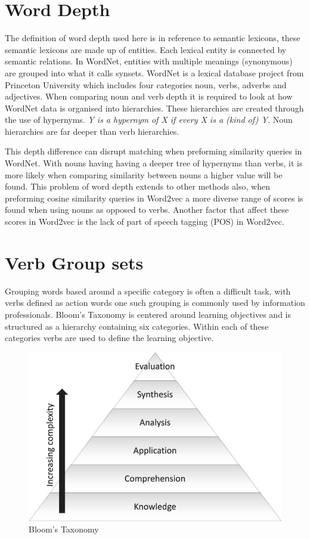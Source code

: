 \section{Word Depth} 
The definition of word depth used here is in reference to semantic lexicons, these semantic lexicons are made up of entities. Each lexical entity is connected by semantic relations. In WordNet, entities with multiple meanings (synonymous) are grouped into what it calls synsets. WordNet is a lexical database project from Princeton University which includes four categories noun, verbs, adverbs and adjectives. When comparing noun and verb depth it is required to look at how WordNet data is organised into hierarchies. These hierarchies are created through the use of hypernyms. \textit{Y is a hypernym of X if every X is a (kind of) Y.} Noun hierarchies are far deeper than verb hierarchies.

This depth difference can disrupt matching when preforming similarity queries in WordNet. With nouns having having a deeper tree of hypernyms than verbs, it is more likely when comparing similarity between nouns a higher value will be found. This problem of word depth extends to other methods also, when preforming cosine similarity queries in Word2vec a more diverse range of scores is found when using nouns as opposed to verbs. Another factor that affect these scores in Word2vec is the lack of part of speech tagging (POS) in Word2vec.

\section{Verb Group sets}
Grouping words based around a specific category is often a difficult task, with verbs defined as action words one such grouping is commonly used by information professionals. Bloom's Taxonomy is centered around learning objectives and is structured as a hierarchy containing six categories. Within each of these categories verbs are used to define the learning objective.

\begin{figure}[H]
\centering
  \includegraphics[width=\textwidth]{images/bloom.jpg}
  \caption{Bloom's Taxonomy}
  \label{fig:bloom}
\end{figure}

